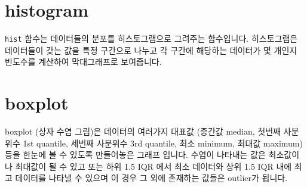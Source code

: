 \documentclass[
]{book}
\newenvironment{Shaded}{\begin{snugshade}}{\end{snugshade}}
\newcommand{\AttributeTok}[1]{\textcolor[rgb]{0.77,0.63,0.00}{#1}}
\newcommand{\DecValTok}[1]{\textcolor[rgb]{0.00,0.00,0.81}{#1}}
\newcommand{\FunctionTok}[1]{\textcolor[rgb]{0.00,0.00,0.00}{#1}}
\newcommand{\NormalTok}[1]{#1}
\newcommand{\OtherTok}[1]{\textcolor[rgb]{0.56,0.35,0.01}{#1}}
\newcommand{\SpecialCharTok}[1]{\textcolor[rgb]{0.00,0.00,0.00}{#1}}
\newcommand{\StringTok}[1]{\textcolor[rgb]{0.31,0.60,0.02}{#1}}
\begin{document}
\hypertarget{histogram}{%
\section{histogram}\label{histogram}}

\texttt{hist} 함수는 데이터들의 분포를 히스토그램으로 그려주는 함수입니다. 히스토그램은 데이터들이 갖는 값을 특정 구간으로 나누고 각 구간에 해당하는 데이터가 몇 개인지 빈도수를 계산하여 막대그래프로 보여줍니다.

\begin{Shaded}
\end{Shaded}

\hypertarget{boxplot}{%
\section{boxplot}\label{boxplot}}

boxplot (상자 수염 그림)은 데이터의 여러가지 대표값 (중간값 median, 첫번째 사분위수 1st quantile, 세번째 사분위수 3rd quantile, 최소 minimum, 최대값 maximum) 등을 한눈에 볼 수 있도록 만들어놓은 그래프 입니다. 수염이 나타내는 값은 최소값이나 최대값이 될 수 있고 또는 하위 1.5 IQR 에서 최소 데이터와 상위 1.5 IQR 내에 최고 데이터를 나타낼 수 있으며 이 경우 그 외에 존재하는 값들은 outlier가 됩니다.
\end{document}

